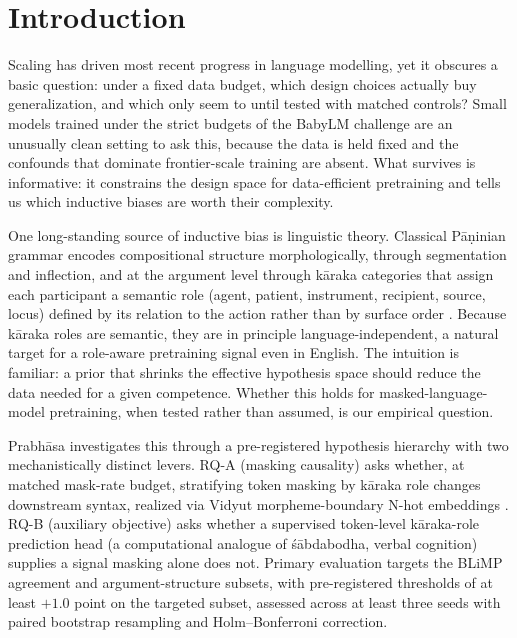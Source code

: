 \documentclass[11pt]{article}
\begin{document}
\section{Introduction}
\label{sec:intro}
Scaling has driven most recent progress in language modelling, yet it obscures a basic question: under a fixed data budget, which design choices actually buy generalization, and which only seem to until tested with matched controls? Small models trained under the strict budgets of the BabyLM challenge \cite{Warstadt2023,Hu2024BabyLM} are an unusually clean setting to ask this, because the data is held fixed and the confounds that dominate frontier-scale training are absent. What survives is informative: it constrains the design space for data-efficient pretraining and tells us which inductive biases are worth their complexity.

One long-standing source of inductive bias is linguistic theory. Classical P\=a\d{n}inian grammar \cite{Matilal1990WordWorld} encodes compositional structure morphologically, through segmentation and inflection, and at the argument level through k\=araka categories that assign each participant a semantic role (agent, patient, instrument, recipient, source, locus) defined by its relation to the action rather than by surface order \cite{KiparskyStaal1969,Cardona1974Karaka}. Because k\=araka roles are semantic, they are in principle language-independent, a natural target for a role-aware pretraining signal even in English. The intuition is familiar: a prior that shrinks the effective hypothesis space should reduce the data needed for a given competence. Whether this holds for masked-language-model pretraining, when tested rather than assumed, is our empirical question.

Prabh\=asa investigates this through a pre-registered hypothesis hierarchy with two mechanistically distinct levers. RQ-A (masking causality) asks whether, at matched mask-rate budget, stratifying token masking by k\=araka role changes downstream syntax, realized via Vidyut morpheme-boundary N-hot embeddings \cite{Prasad2024Vidyut}. RQ-B (auxiliary objective) asks whether a supervised token-level k\=araka-role prediction head (a computational analogue of \'s\=abdabodha, verbal cognition) supplies a signal masking alone does not. Primary evaluation targets the BLiMP agreement and argument-structure subsets, with pre-registered thresholds of at least $+1.0$ point on the targeted subset, assessed across at least three seeds with paired bootstrap resampling and Holm--Bonferroni correction.
\end{document}
